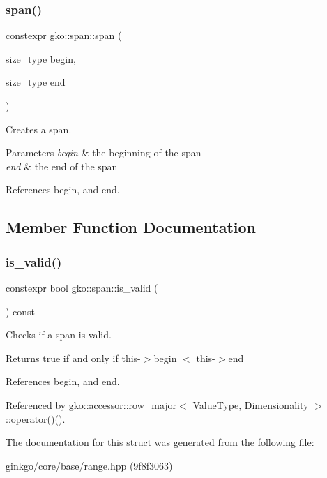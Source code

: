 \subsubsection{\texorpdfstring{span()}{span()}\hspace{0.1cm}{\footnotesize\ttfamily [2/2]}}
{\footnotesize\ttfamily constexpr gko\+::span\+::span (\begin{DoxyParamCaption}\item[{\hyperlink{namespacegko_a6e5c95df0ae4e47aab2f604a22d98ee7}{size\+\_\+type}}]{begin,  }\item[{\hyperlink{namespacegko_a6e5c95df0ae4e47aab2f604a22d98ee7}{size\+\_\+type}}]{end }\end{DoxyParamCaption})\hspace{0.3cm}{\ttfamily [noexcept]}}



Creates a span. 


\begin{DoxyParams}{Parameters}
{\em begin} & the beginning of the span \\
\hline
{\em end} & the end of the span \\
\hline
\end{DoxyParams}


References begin, and end.



\subsection{Member Function Documentation}
\mbox{\label{structgko_1_1span_a32a87f434708e6857820858503f9b133}} 
\subsubsection{\texorpdfstring{is\+\_\+valid()}{is\_valid()}}
{\footnotesize\ttfamily constexpr bool gko\+::span\+::is\+\_\+valid (\begin{DoxyParamCaption}{ }\end{DoxyParamCaption}) const}



Checks if a span is valid. 

\begin{DoxyReturn}{Returns}
true if and only if {\ttfamily this-\/$>$begin $<$ this-\/$>$end} 
\end{DoxyReturn}


References begin, and end.



Referenced by gko\+::accessor\+::row\+\_\+major$<$ Value\+Type, Dimensionality $>$\+::operator()().



The documentation for this struct was generated from the following file\+:\begin{DoxyCompactItemize}
\item 
ginkgo/core/base/range.\+hpp (9f8f3063)\end{DoxyCompactItemize}
